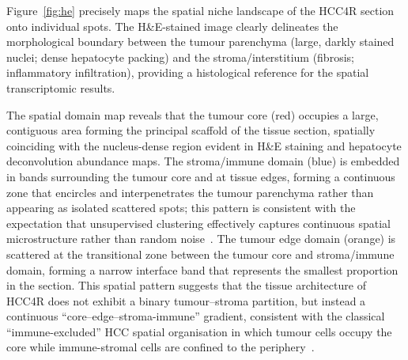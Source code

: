 \documentclass[12pt, a4paper]{article}
\begin{document}
Figure~\ref{fig:he} precisely maps the spatial niche landscape of the HCC4R section onto individual spots. The H\&E-stained image clearly delineates the morphological boundary between the tumour parenchyma (large, darkly stained nuclei; dense hepatocyte packing) and the stroma/interstitium (fibrosis; inflammatory infiltration), providing a histological reference for the spatial transcriptomic results.

The spatial domain map reveals that the tumour core (red) occupies a large, contiguous area forming the principal scaffold of the tissue section, spatially coinciding with the nucleus-dense region evident in H\&E staining and hepatocyte deconvolution abundance maps. The stroma/immune domain (blue) is embedded in bands surrounding the tumour core and at tissue edges, forming a continuous zone that encircles and interpenetrates the tumour parenchyma rather than appearing as isolated scattered spots; this pattern is consistent with the expectation that unsupervised clustering effectively captures continuous spatial microstructure rather than random noise~\citep{schurch2020coordinated}. The tumour edge domain (orange) is scattered at the transitional zone between the tumour core and stroma/immune domain, forming a narrow interface band that represents the smallest proportion in the section. This spatial pattern suggests that the tissue architecture of HCC4R does not exhibit a binary tumour--stroma partition, but instead a continuous ``core--edge--stroma-immune'' gradient, consistent with the classical ``immune-excluded'' HCC spatial organisation in which tumour cells occupy the core while immune-stromal cells are confined to the periphery~\citep{llovet2021hepatocellular,binnewies2018understanding}.
\end{document}
